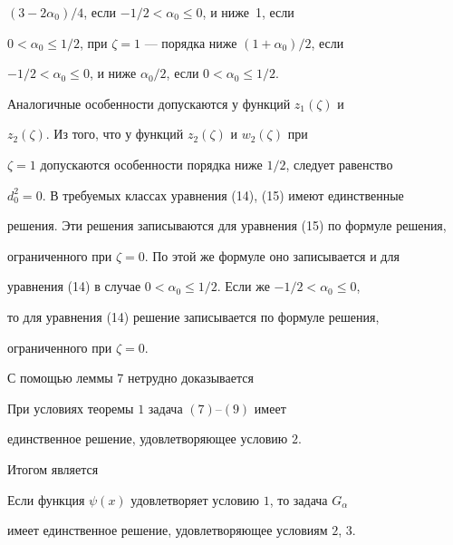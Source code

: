 \begin{pf}
$(3-2\alpha_0)/4$, если $-1/2<\alpha_0\le0$, и ниже~1, если 


$0<\alpha_0\le1/2$, при $\zeta=1$ --- порядка ниже $(1+\alpha_0)/2$, если 


$-1/2<\alpha_0\le0$, и ниже $\alpha_0/2$, если $0<\alpha_0\le1/2$. 


Аналогичные особенности допускаются у функций $z_1(\zeta)$ и 


$z_2(\zeta)$. Из того, что у функций $z_2(\zeta)$ и $w_2(\zeta)$ при 


$\zeta=1$ допускаются особенности порядка ниже $1/2$, следует равенство 


$d^2_0=0$. В требуемых классах уравнения (14), (15) имеют единственные 


решения. Эти решения записываются для уравнения (15) по формуле решения, 


ограниченного при $\zeta=0$. По этой же формуле оно записывается и для 


уравнения (14) в случае $0<\alpha_0\le1/2$. Если же $-1/2<\alpha_0\le0$, 


то для уравнения (14) решение записывается по формуле решения, 


ограниченного при $\zeta=0$. 


\end{pf} 


 


С помощью леммы 7 нетрудно доказывается 


 


 


\begin{thm} 


При условиях теоремы $1$ задача $(7)$--\/$(9)$ имеет 


единственное решение, удовлетворяющее условию $2$. 


\end{thm} 


 


Итогом является 


 


 


\begin{thm} 


Если функция $\psi(x)$ удовлетворяет условию $1$, то задача $G_\alpha$ 


имеет единственное решение, удовлетворяющее условиям $2$, $3$. 


\end{thm} 


